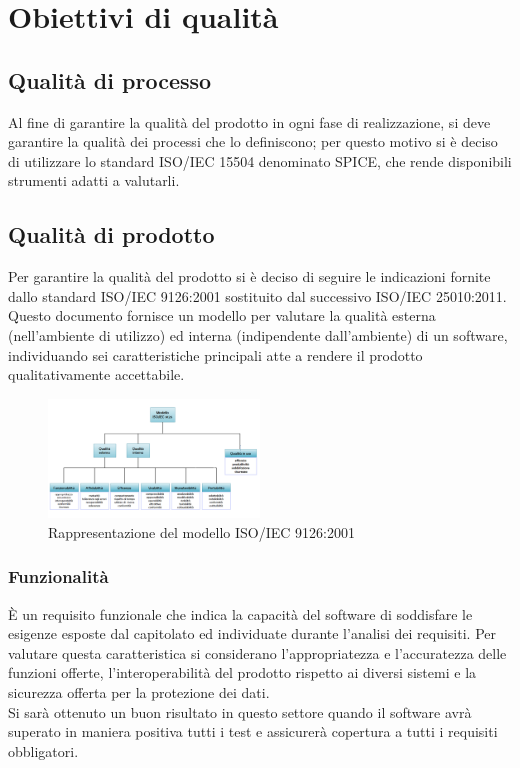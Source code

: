\section{Obiettivi di qualità} 
\subsection{Qualità di processo}

Al fine di garantire la qualità del prodotto in ogni fase di realizzazione, si deve garantire la qualità dei processi che lo definiscono; per questo motivo si è deciso di utilizzare lo standard ISO/IEC 15504 denominato SPICE, che rende disponibili strumenti adatti a valutarli.

\subsection{Qualità di prodotto}
Per garantire la qualità del prodotto si è deciso di seguire le indicazioni fornite dallo standard ISO/IEC 9126:2001 sostituito dal successivo ISO/IEC 25010:2011. Questo documento fornisce un modello per valutare la qualità esterna (nell’ambiente di utilizzo) ed interna (indipendente dall’ambiente) di un software, individuando sei caratteristiche principali atte a rendere il prodotto qualitativamente accettabile.

\begin{figure}[h]
  \centering
    \includegraphics[width=0.5\textwidth]{./images/ISO-IEC_9126}
  \caption{Rappresentazione del modello ISO/IEC 9126:2001}
  \label{fig:ISO-IEC_9126}
\end{figure}


\subsubsection{Funzionalità}
È un requisito funzionale che indica la capacità del software di soddisfare le esigenze esposte dal capitolato ed individuate durante l’analisi dei requisiti. Per valutare questa caratteristica si considerano l'appropriatezza e l'accuratezza delle funzioni offerte, l'interoperabilità del prodotto rispetto ai diversi sistemi e la sicurezza offerta per la protezione dei dati.\\ 
Si sarà ottenuto un buon risultato in questo settore quando il software avrà superato in maniera positiva tutti i test e assicurerà copertura a tutti i requisiti obbligatori.

